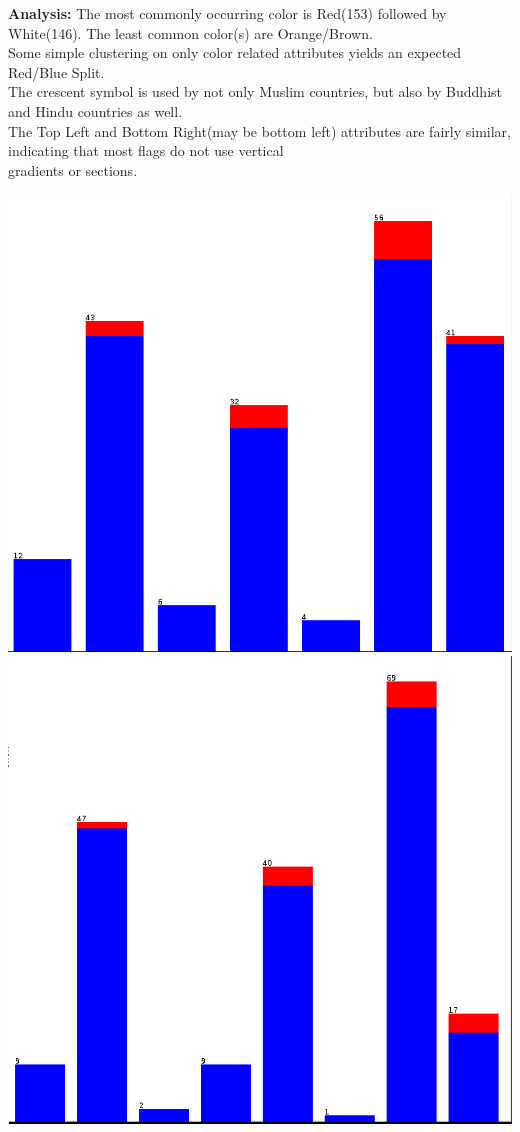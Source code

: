 \documentclass[11pt]{article}
\begin{document}
\textbf{Analysis:}
	The most commonly occurring color is Red(153) followed by White(146). The least common color(s) are Orange/Brown. \\
	
	Some simple clustering on only color related attributes yields an expected Red/Blue Split.\\
	
	The crescent symbol is used by not only Muslim countries, but also by Buddhist and Hindu countries as well.\\
	
	The Top Left and Bottom Right(may be bottom left) attributes are fairly similar, indicating that most flags do not use vertical\\ gradients or sections.
	
\includegraphics[scale=.2]{topleft} 
\includegraphics[scale=.2]{botright} \\
\end{document}
